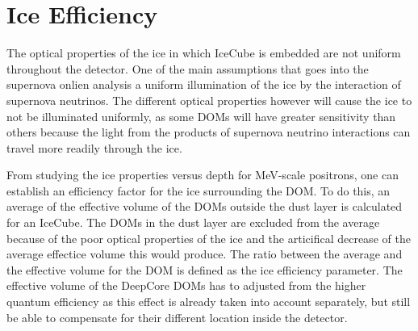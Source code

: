 \section{Ice Efficiency}

The optical properties of the ice in which IceCube is embedded are not uniform throughout the detector. One of the main assumptions that goes into the supernova onlien analysis a uniform illumination of the ice by the interaction of supernova neutrinos. The different optical properties however will cause the ice to not be illuminated uniformly, as some DOMs will have greater sensitivity than others because the light from the products of supernova neutrino interactions can travel more readily through the ice.

From studying the ice properties versus depth for MeV-scale positrons, one can establish an efficiency factor for the ice surrounding the DOM. To do this, an average of the effective volume of the DOMs outside the dust layer is calculated for an IceCube. The DOMs in the dust layer are excluded from the average because of the poor optical properties of the ice and the articifical decrease of the average effectice volume this would produce. The ratio between the average and the effective volume for the DOM is defined as the ice efficiency parameter. The effective volume of the DeepCore DOMs has to adjusted from the higher quantum efficiency as this effect is already taken into account separately, but still be able to compensate for their different location inside the detector. 